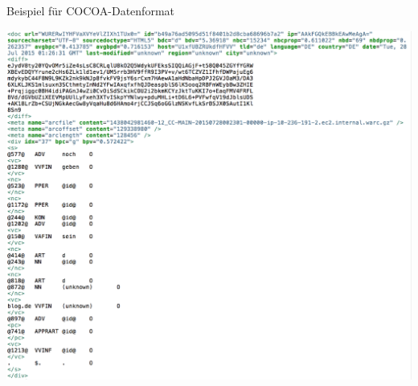 \begin{frame}
	{Beispiel für COCOA-Datenformat}

	\centering
	\includegraphics[height=0.85\textheight]{graphics/cocoa}

\end{frame}
